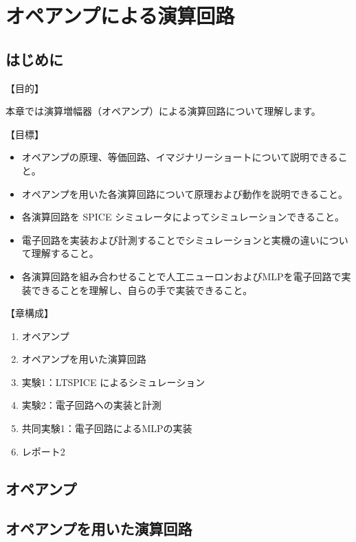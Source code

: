 \chapter{オペアンプによる演算回路}

\section{はじめに}

【目的】

本章では演算増幅器（オペアンプ）による演算回路について理解します。

【目標】

\begin{itemize}
    \item オペアンプの原理、等価回路、イマジナリーショートについて説明できること。
    \item オペアンプを用いた各演算回路について原理および動作を説明できること。
    \item 各演算回路を SPICE シミュレータによってシミュレーションできること。
    \item 電子回路を実装および計測することでシミュレーションと実機の違いについて理解すること。
    \item 各演算回路を組み合わせることで人工ニューロンおよびMLPを電子回路で実装できることを理解し、自らの手で実装できること。
\end{itemize}

【章構成】

\begin{enumerate}
    \item オペアンプ
    \item オペアンプを用いた演算回路
    \item 実験1：LTSPICE によるシミュレーション
    \item 実験2：電子回路への実装と計測
    \item 共同実験1：電子回路によるMLPの実装
    \item レポート2
\end{enumerate}

\section{オペアンプ}




\section{オペアンプを用いた演算回路}

